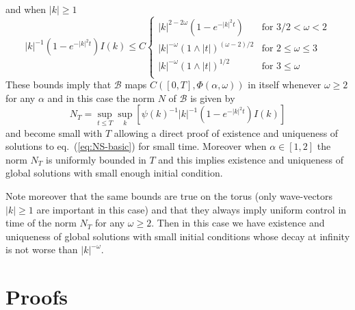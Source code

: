 \documentclass[a4paper,12pt,reqno]{amsart}
\newcommand{\1}{{\bf 1}}
\begin{document}
and when $|k| \ge 1$
\begin{equation*}
|k|^{-1} (1-e^{-|k|^2 t}) I(k) \le C \begin{cases}
 |k|^{2-2\omega} (1-e^{-|k|^2 t}) & \text{for $3/2 < \omega < 2$}\\
 |k|^{-\omega} (1 \wedge |t|)^{(\omega-2)/2} & \text{for $2 \le \omega \le 3$}\\
 |k|^{-\omega} (1 \wedge |t|)^{1/2} & \text{for $3 \le \omega$}\\
\end{cases}  
\end{equation*}
These bounds imply that $\mathcal{B}$ maps
$C([0,T],\Phi(\alpha,\omega))$ in itself whenever $\omega \ge 2$ for
any $\alpha$ and in this case the norm $N$ of $\mathcal{B}$ is given
by $$N_T = \sup_{t \le T} \sup_k [\psi(k)^{-1} |k|^{-1} (1-e^{-|k|^2
t}) I(k)]$$ and become  small
with $T$ allowing a direct proof of existence and uniqueness of
solutions to eq.~(\ref{eq:NS-basic}) for small time. Moreover when
$\alpha \in [1,2]$ the norm $N_T$ is
uniformly bounded in $T$ and this implies existence and uniqueness of
global solutions with small enough initial condition. 

Note moreover that the same bounds are true on the torus (only wave-vectors $|k| \ge 1$ are important in this case) and that they always imply
uniform control in time of the norm $N_T$ for any $\omega \ge 2$. Then
in this case we have existence and uniqueness of global solutions with
small initial conditions whose decay at infinity is not worse than $|k|^{-\omega}$.

\section{Proofs}
\label{sec:proofs}
\end{document}
